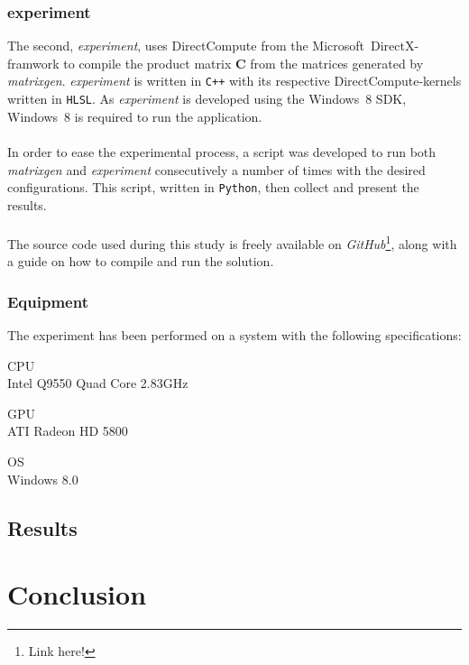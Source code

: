 \documentclass[fleqn,10pt]{SelfArx} %
\begin{document}
\subsubsection*{experiment}
The second, \textit{experiment}, uses DirectCompute from the Microsoft~DirectX-framwork to compile the product matrix \textbf{C} from the matrices generated by \textit{matrixgen}. \textit{experiment} is written in \texttt{C++} with its respective DirectCompute-kernels written in \texttt{HLSL}. As \textit{experiment} is developed using the Windows~8 SDK, Windows~8 is required to run the application. \\
\\
In order to ease the experimental process, a script was developed to run both \textit{matrixgen} and \textit{experiment} consecutively a number of times with the desired configurations. This script, written in \texttt{Python}, then collect and present the results. \\
\\
The source code used during this study is freely available on \textit{GitHub}\footnote{Link here!}, along with a guide on how to compile and run the solution.

\subsubsection*{Equipment}
The experiment has been performed on a system with the following specifications:
\begin{description*}
	\item[CPU] \hfill \\
		Intel Q9550 Quad Core 2.83GHz
	\item[GPU] \hfill \\
		ATI Radeon HD 5800
	\item[OS] \hfill \\
		Windows 8.0
\end{description*}

\subsection{Results}
\label{sec:contribution:results}


\section{Conclusion}
\label{sec:conclusion}
\end{document}
